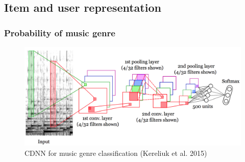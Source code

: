\documentclass{beamer}
\begin{document}
\subsection{Item and user representation}
\begin{frame}
	\frametitle{Probability of music genre}
	\begin{figure}[ht!]
		\centering
		\includegraphics[width=\textwidth]{CDNN.png}
		\caption{CDNN for music genre classification (Kereliuk et al. 2015)}
	\end{figure}
\end{frame}
\end{document}
